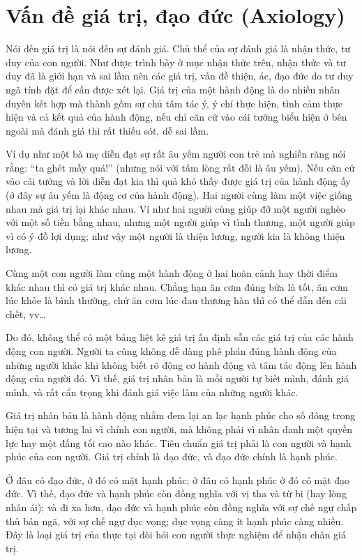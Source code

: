 \section{Vấn đề giá trị, đạo đức (Axiology)} %
\label{sec:van_de_gia_tri_dao_duc}

Nói đến giá trị là nói đến sự đánh giá. Chủ thể của sự đánh giá là nhận thức, tư duy của con người. Như được trình bày ở mục nhận thức trên, nhận thức và tư duy đã là giới hạn và sai lầm nên các giá trị, vấn đề thiện, ác, đạo đức do tư duy ngã tính đặt để cần được xét lại. Giá trị của một hành động là do nhiều nhân duyên kết hợp mà thành gồm sự chủ tâm tác ý, ý chí thực hiện, tình cảm thực hiện và cả kết quả của hành động, nếu chỉ căn cứ vào cái tướng biểu hiện ở bên ngoài mà đánh giá thì rất thiếu sót, dễ sai lầm.

Ví dụ như một bà mẹ diễn đạt sự rất âu yếm người con trẻ mà nghiến răng nói rằng: ``ta ghét mầy quá!'' (nhưng nói với tấm lòng rất đỗi là âu yếm). Nếu căn cứ vào cái tướng và lời diễn đạt kia thì quả khó thấy được giá trị của hành động ấy (ở đây sự âu yếm là động cơ của hành động). Hai người cùng làm một việc giống nhau mà giá trị lại khác nhau. Ví như hai người cùng giúp đỡ một người nghèo với một số tiền bằng nhau, nhưng một người giúp vì tình thương, một người giúp vì có ý đồ lợi dụng; như vậy một người là thiện lương, người kia là không thiện lương.

Cùng một con người làm cùng một hành động ở hai hoàn cảnh hay thời điểm khác nhau thì có giá trị khác nhau. Chẳng hạn ăn cơm đúng bữa là tốt, ăn cơm lúc khỏe là bình thường, chứ ăn cơm lúc đau thương hàn thì có thể dẫn đến cái chết, vv\ldots

Do đó, không thể có một bảng liệt kê giá trị ấn định sẵn các giá trị của các hành động con người. Người ta cũng không dễ dàng phê phán đúng hành động của những người khác khi không biết rõ động cơ hành động và tâm tác động lên hành động của người đó. Vì thế, giá trị nhân bản là mỗi người tự biết mình, đánh giá mình, và rất cẩn trọng khi đánh giá việc làm của những người khác.

Giá trị nhân bản là hành động nhằm đem lại an lạc hạnh phúc cho số đông trong hiện tại và tương lai vì chính con người, mà không phải vì nhân danh một quyền lực hay một đấng tối cao nào khác. Tiêu chuẩn giá trị phải là con người và hạnh phúc của con người. Giá trị chính là đạo đức, và đạo đức chính là hạnh phúc.

Ở đâu có đạo đức, ở đó có mặt hạnh phúc; ở đâu có hạnh phúc ở đó có mặt đạo đức. Vì thế, đạo đức và hạnh phúc còn đồng nghĩa với vị tha và từ bi (hay lòng nhân ái); và đi xa hơn, đạo đức và hạnh phúc còn đồng nghĩa với sự chế ngự chấp thủ bản ngã, với sự chế ngự dục vọng; dục vọng càng ít hạnh phúc càng nhiều. Đây là loại giá trị của thực tại đòi hỏi con người thực nghiệm để nhận chân giá trị.

